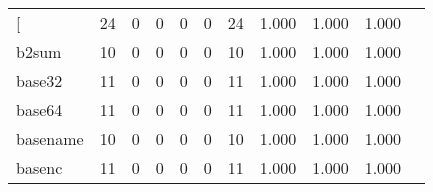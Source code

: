 \begin{longtable}{lp{1.2cm}p{1.2cm}p{1.2cm}p{1.2cm}p{1.2cm}p{1.2cm}p{1.2cm}p{1.2cm}p{1.2cm}p{1.2cm}}
\bottomrule
\endlastfoot
{[}         &                                    24 &                                                  0 &                                                  0 &                                                  0 &                                                  0 &                                                 24 &                                         1.000 &                                              1.000 &                                              1.000 \\
b2sum     &                                    10 &                                                  0 &                                                  0 &                                                  0 &                                                  0 &                                                 10 &                                         1.000 &                                              1.000 &                                              1.000 \\
base32    &                                    11 &                                                  0 &                                                  0 &                                                  0 &                                                  0 &                                                 11 &                                         1.000 &                                              1.000 &                                              1.000 \\
base64    &                                    11 &                                                  0 &                                                  0 &                                                  0 &                                                  0 &                                                 11 &                                         1.000 &                                              1.000 &                                              1.000 \\
basename  &                                    10 &                                                  0 &                                                  0 &                                                  0 &                                                  0 &                                                 10 &                                         1.000 &                                              1.000 &                                              1.000 \\
basenc    &                                    11 &                                                  0 &                                                  0 &                                                  0 &                                                  0 &                                                 11 &                                         1.000 &                                              1.000 &                                              1.000 \\

\end{longtable}
